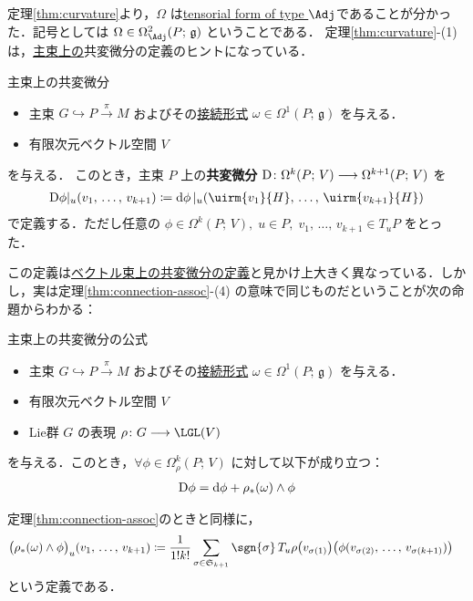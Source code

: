 \documentclass[TQFT_main]{subfiles}
\begin{document}
定理\ref{thm:curvature}より，$\Omega$ は\hyperref[def:tensorial-form]{tensorial form of type $\Adj$}であることが分かった．記号としては $\Omega \in \Omega^2_{\Adj} (P;\, \mathfrak{g})$ ということである．
定理\ref{thm:curvature}-(1) は，\underline{主束上の}共変微分の定義のヒントになっている．

\begin{mydef}[label=def:codv-pbun]{主束上の共変微分}
    \begin{itemize}
        \item 主束 $G \hookrightarrow P \xrightarrow{\pi} M$ およびその\hyperref[def:connection]{接続形式} $\omega \in \Omega^1(P;\, \mathfrak{g})$ を与える．
        \item 有限次元ベクトル空間 $V$
    \end{itemize}
    を与える．
    このとき，主束 $P$ 上の\textbf{共変微分} $\mathrm{D}\colon \Omega^k (P;\, V) \longrightarrow \Omega^{k+1}(P;\, V)$ を
    \begin{align}
        \codd{\phi}|_u (v_1,\, \dots,\, v_{k+1}) \coloneqq \dd{\phi}|_u (\uirm{v_1}{H},\, \dots,\, \uirm{v_{k+1}}{H})
    \end{align}
    で定義する．ただし任意の $\phi \in \Omega^k (P;\, V),\; u \in P,\; v_1,\, \dots,\, v_{k+1} \in T_u P$ をとった．
\end{mydef}

この定義は\hyperref[def:connection-vect]{ベクトル束上の共変微分の定義}と見かけ上大きく異なっている．しかし，実は定理\ref{thm:connection-assoc}-(4) の意味で同じものだということが次の命題からわかる：

\begin{myprop}[label=prop:codv-pbun]{主束上の共変微分の公式}
    \begin{itemize}
        \item 主束 $G \hookrightarrow P \xrightarrow{\pi} M$ およびその\hyperref[def:connection]{接続形式} $\omega \in \Omega^1(P;\, \mathfrak{g})$ を与える．
        \item 有限次元ベクトル空間 $V$ 
        \item Lie群 $G$ の表現 $\rho \colon G \lto \LGL(V)$
    \end{itemize}
    を与える．このとき，$\forall \phi \in \Omega^k_\rho (P;\, V)$ に対して以下が成り立つ：
    \begin{align}
        \mathrm{D}\phi = \dd{\phi} + \rho_* (\omega) \wedge \phi
    \end{align}
\end{myprop}

\begin{marker}
    定理\ref{thm:connection-assoc}のときと同様に，
    \begin{align}
        \label{eq:codv-pbun}
        \bigl(\rho_* (\omega) \wedge \phi\bigr)_u (v_1,\, \dots,\, v_{k+1})
        &\coloneqq \frac{1}{1! k!} \sum_{\sigma \in \mathfrak{S}_{k+1}} \sgn{\sigma}\, T_u \rho \bigl( v_{\sigma(1)} \bigr) \bigl( \phi(v_{\sigma(2)},\, \dots,\, v_{\sigma(k+1)}) \bigr) 
    \end{align}
    という定義である．
\end{marker}
\end{document}
